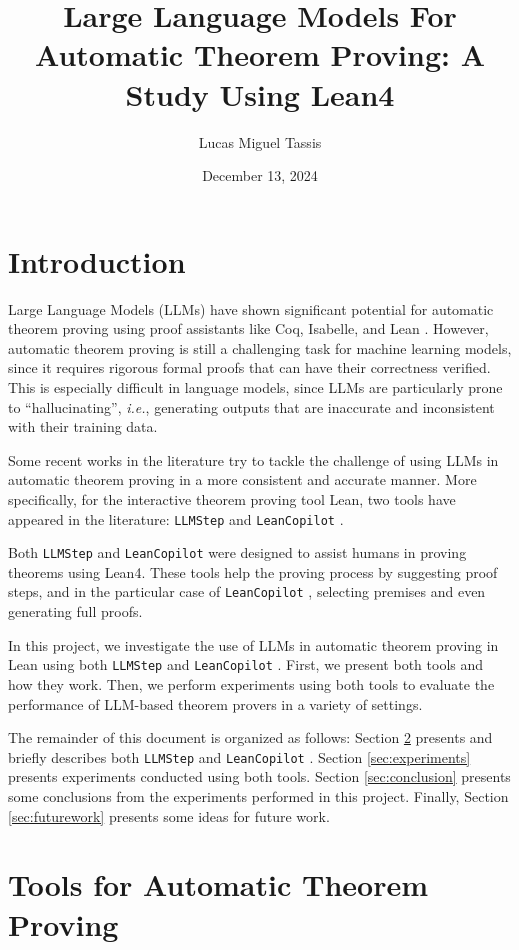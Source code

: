 \documentclass[12pt]{article}
\title{\bf{Large Language Models For Automatic Theorem Proving: A Study Using Lean4}}
\author{Lucas Miguel Tassis}
\date{December 13, 2024}
\newcommand{\leancopilot}{\texttt{LeanCopilot} }
\newcommand{\llmstep}{\texttt{LLMStep} }
\begin{document}
\maketitle
\thispagestyle{fancy}

\renewcommand{\contentsname}{Table of Contents}
\tableofcontents

\newpage
\section{Introduction}
Large Language Models (LLMs) have shown significant potential for automatic theorem proving using proof assistants like Coq, Isabelle, and Lean \cite{neurips}. However, automatic theorem proving is still a challenging task for machine learning models, since it requires rigorous formal proofs that can have their correctness verified. This is especially difficult in language models, since LLMs are particularly prone to ``hallucinating'', \emph{i.e.}, generating outputs that are inaccurate and inconsistent with their training data.

Some recent works in the literature try to tackle the challenge of using LLMs in automatic theorem proving in a more consistent and accurate manner. More specifically, for the interactive theorem proving tool Lean,
two tools have appeared in the literature: \llmstep \cite{llmstep} and \leancopilot \cite{leancopilot}.

Both \llmstep and \leancopilot were designed to assist humans in proving theorems using Lean4. These tools help the proving process by suggesting  proof steps, and in the particular case of \leancopilot, selecting premises and even generating full proofs. 

In this project, we investigate the use of LLMs in automatic theorem proving in Lean using both \llmstep and \leancopilot. First, we present both tools and how they work. Then, we perform experiments using both tools to evaluate the performance of LLM-based theorem provers in a variety of settings. 

The remainder of this document is organized as follows: Section \ref{sec:tools} presents and briefly describes both \llmstep and \leancopilot. Section \ref{sec:experiments} presents experiments conducted using both tools. Section \ref{sec:conclusion} presents some conclusions from the experiments performed in this project. Finally, Section \ref{sec:futurework} presents some ideas for future work.

\section{Tools for Automatic Theorem Proving} \label{sec:tools}
\end{document}
